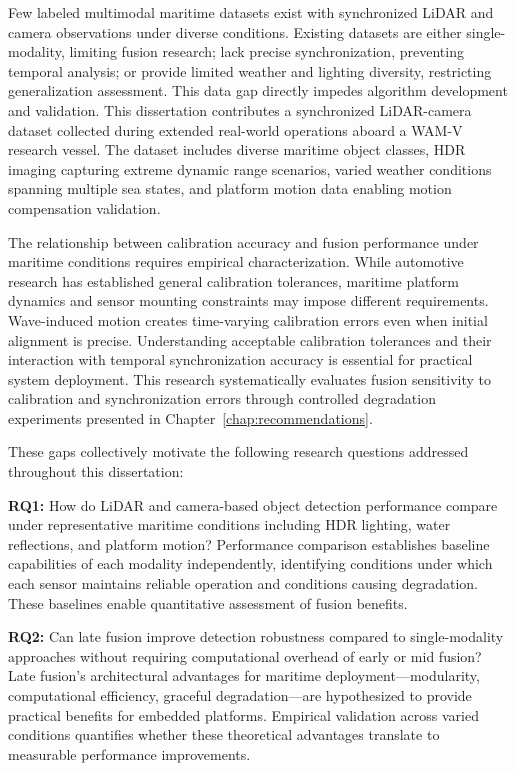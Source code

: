 \documentclass[../main.tex]{subfiles}
\begin{document}
Few labeled multimodal maritime datasets exist with synchronized LiDAR and camera observations under diverse conditions. Existing datasets are either single-modality, limiting fusion research; lack precise synchronization, preventing temporal analysis; or provide limited weather and lighting diversity, restricting generalization assessment. This data gap directly impedes algorithm development and validation. This dissertation contributes a synchronized LiDAR-camera dataset collected during extended real-world operations aboard a WAM-V research vessel. The dataset includes diverse maritime object classes, HDR imaging capturing extreme dynamic range scenarios, varied weather conditions spanning multiple sea states, and platform motion data enabling motion compensation validation.

The relationship between calibration accuracy and fusion performance under maritime conditions requires empirical characterization. While automotive research has established general calibration tolerances, maritime platform dynamics and sensor mounting constraints may impose different requirements. Wave-induced motion creates time-varying calibration errors even when initial alignment is precise. Understanding acceptable calibration tolerances and their interaction with temporal synchronization accuracy is essential for practical system deployment. This research systematically evaluates fusion sensitivity to calibration and synchronization errors through controlled degradation experiments presented in Chapter~\ref{chap:recommendations}.

These gaps collectively motivate the following research questions addressed throughout this dissertation:

\textbf{RQ1:} How do LiDAR and camera-based object detection performance compare under representative maritime conditions including HDR lighting, water reflections, and platform motion? Performance comparison establishes baseline capabilities of each modality independently, identifying conditions under which each sensor maintains reliable operation and conditions causing degradation. These baselines enable quantitative assessment of fusion benefits.

\textbf{RQ2:} Can late fusion improve detection robustness compared to single-modality approaches without requiring computational overhead of early or mid fusion? Late fusion's architectural advantages for maritime deployment—modularity, computational efficiency, graceful degradation—are hypothesized to provide practical benefits for embedded platforms. Empirical validation across varied conditions quantifies whether these theoretical advantages translate to measurable performance improvements.
\end{document}
